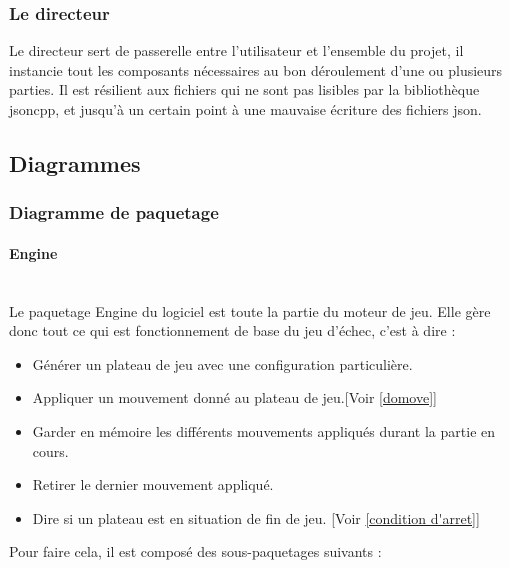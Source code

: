 \documentclass{article}
\begin{document}
\subsubsection{Le directeur}
Le directeur sert de passerelle entre l'utilisateur et l'ensemble du projet, il instancie tout les composants nécessaires au bon déroulement d'une ou plusieurs parties.
Il est résilient aux fichiers qui ne sont pas lisibles par la bibliothèque jsoncpp, et jusqu'à un certain point à une mauvaise écriture des fichiers json.

\newpage
\subsection{Diagrammes}
\subsubsection{Diagramme de paquetage}
\paragraph{Engine}
~~\\
\newline
Le paquetage Engine du logiciel est toute la partie du moteur de jeu.\newline 
Elle gère donc tout ce qui est fonctionnement de base du jeu d'échec, c'est à dire : 
\begin{itemize}
    \item Générer un plateau de jeu avec une configuration particulière.
    \item Appliquer un mouvement donné au plateau de jeu.[Voir \ref{domove}]
    \item Garder en mémoire les différents mouvements appliqués durant la partie en cours.
    \item Retirer le dernier mouvement appliqué.
    \item Dire si un plateau est en situation de fin de jeu. [Voir \ref{condition d'arret}]
\end{itemize}
Pour faire cela, il est composé des sous-paquetages suivants :
\end{document}
